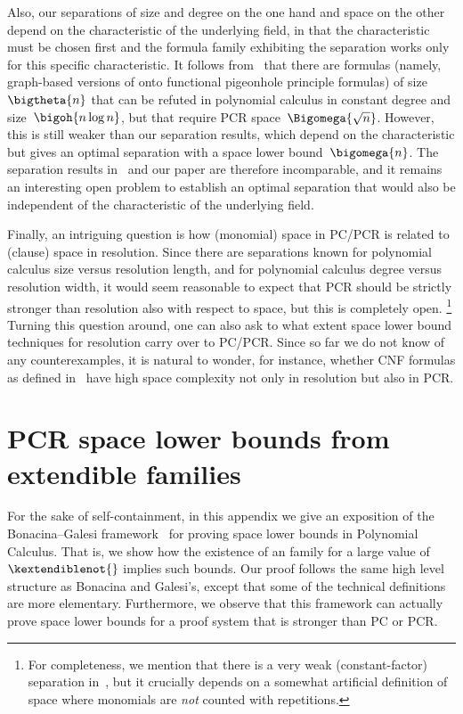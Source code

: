 \documentclass{toc}
\begin{document}
Also, our separations of size and degree on the one hand and space on
the other depend on the characteristic of the 
underlying field, in that the characteristic must be chosen
first and the formula  family exhibiting the separation works only
for this specific characteristic.
It follows from~\cite{GKT19SpaceWidth} that there are formulas
(namely, graph-based versions of onto functional pigeonhole principle
formulas) of size $\bigtheta{n}$ that can be refuted in polynomial
calculus  in constant degree and size~$\bigoh{n \log n}$,
but that require PCR space~$\Bigomega{\sqrt{n}}$.
However, this is still weaker than our separation results, which
depend on the characteristic but gives an optimal separation with a
space lower bound~$\bigomega{n}$. The separation results
in~\cite{GKT19SpaceWidth} and our paper are therefore incomparable,
and it remains an interesting open problem to establish an optimal
separation that would also be independent of the characteristic of the
underlying field.

Finally, an intriguing question is how (monomial) space in PC/PCR is
related to (clause) space in resolution. Since there are separations
known for polynomial calculus size versus resolution length, and for
polynomial calculus degree versus resolution width, it would seem
reasonable to expect that PCR should be strictly stronger than
resolution also with respect to space, but this is completely open.%
\footnote{%
  For completeness, we mention that there is a very weak
  (constant-factor) separation in~\cite{ABRW02SpaceComplexity}, but it
  crucially depends on a somewhat artificial definition of space where
  monomials are \emph{not} counted with repetitions.}  
%
%
Turning this question around, one can also ask to
what extent space lower bound techniques for
resolution carry over to PC/PCR. Since so far we do not know of any
%
counterexamples, %
it is natural to wonder, for instance, whether
 CNF formulas as defined in~%
\cite{ABRW02SpaceComplexity} have high space complexity not only in
resolution but also in PCR.
 
%
%

\appendix
%
\section{PCR space lower bounds from extendible families}
\label{sec:bg-framework}

%
%
%
%
%
For the sake of self-containment, in this appendix we give an
exposition of the Bonacina--Galesi
framework~\cite{BG15Framework} for proving space lower bounds
in Polynomial Calculus. %
That is, we
show how the existence of an
\kextendible family for a large value of $\kextendiblenot{}$
implies such bounds. %
Our proof follows the same high level structure as Bonacina and Galesi's, except that some of the technical definitions are more elementary. Furthermore, we observe that this
framework can actually prove space lower
bounds for a proof system that %
is   %
stronger than PC or PCR.
\end{document}
